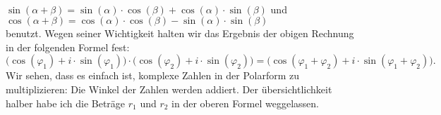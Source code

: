 \\[0.2cm]
\hspace*{1.3cm}
$\sin(\alpha + \beta) = \sin(\alpha) \cdot \cos(\beta) + \cos(\alpha) \cdot \sin(\beta)$ \quad und
\\[0.2cm]
\hspace*{1.3cm}
$\cos(\alpha + \beta) = \cos(\alpha) \cdot \cos(\beta) - \sin(\alpha) \cdot \sin(\beta)$
\\[0.2cm]
benutzt.   Wegen seiner Wichtigkeit halten wir das Ergebnis der obigen Rechnung in der folgenden Formel
fest:
\begin{equation}
  \label{eq:komplex_mult2}
  \bigl(\cos(\varphi_1) + i \cdot \sin(\varphi_1)\bigr) \cdot
  \bigl(\cos(\varphi_2) + i \cdot \sin(\varphi_2)\bigr)       
= \bigl(\cos(\varphi_1 + \varphi_2) + i \cdot \sin(\varphi_1 + \varphi_2) \bigr).
\end{equation}
Wir sehen, dass es einfach ist, komplexe Zahlen in der Polarform zu
multiplizieren: Die Winkel der Zahlen werden addiert.  Der \"{u}bersichtlichkeit halber habe ich
die Betr\"{a}ge $r_1$ und $r_2$ in der oberen Formel weggelassen.  

